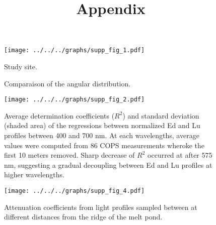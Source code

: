 \documentclass[12pt,a4paper]{scrartcl}
\title{Appendix}
\date{}
\begin{document}
\maketitle

\begin{figure}[h]
	\centering
	\texttt{[image: ../../../graphs/supp\_fig\_1.pdf]}
	\caption{Study site.}
\end{figure}

\clearpage
\newpage

\begin{figure}[h]
	\centering
	\caption{Comparaison of the angular distribution.}
\end{figure}

\clearpage
\newpage

\begin{figure}[h]
	\centering
	\texttt{[image: ../../../graphs/supp\_fig\_2.pdf]}
	\caption{Average determination coefficients ($R^2$) and standard deviation (shaded area) of the regressions between normalized Ed and Lu profiles between 400 and 700 nm. At each wavelengths, average values were computed from 86 COPS measurements wheroke the first 10 meters removed. Sharp decrease of $R^2$ occurred at after 575 nm, suggesting a gradual decoupling between Ed and Lu profiles at higher wavelengths.}
\end{figure}
	
\clearpage
\newpage
	
\begin{figure}[h]
	\centering
	\texttt{[image: ../../../graphs/supp\_fig\_4.pdf]}
	\caption{Attenuation coefficients from light profiles sampled between at different distances from the ridge of the melt pond.}
\end{figure}
\end{document}
